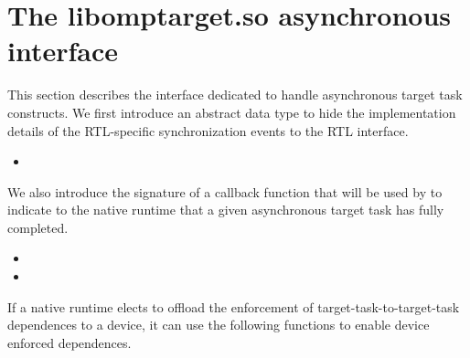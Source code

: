
\section{The libomptarget.so asynchronous interface} \label{sc:LibomptargetAsync}

This section describes the \libomptarget{} interface dedicated to handle asynchronous target task constructs. We first introduce an abstract data type to hide the implementation details of the RTL-specific synchronization events to the RTL interface.

\begin{itemize}
  \item {}
\end{itemize}

We also introduce the signature of a callback function that will be used by \libomptarget{} to indicate to the native runtime that a given asynchronous target task has fully completed.

\begin{itemize}
  \item {}
   \item {}
\end{itemize}

If a native runtime elects to offload the enforcement of target-task-to-target-task dependences to a device, it can use the following functions to enable device enforced dependences.

